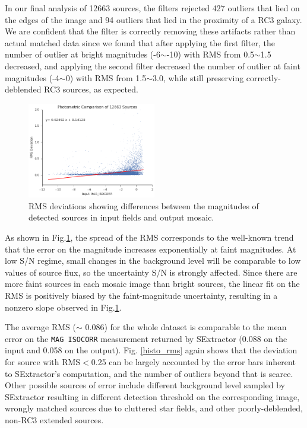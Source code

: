 \documentclass[authoryear, 12pt, 5p, times]{elsarticle}
\begin{document}
	In our final analysis of 12663 sources, the filters rejected 427 outliers that lied on the edges of the image and 94 outliers that lied in the proximity of a RC3 galaxy. We are confident that the filter is correctly removing these artifacts rather than actual matched data since we found that after applying the first filter,  the number of outlier at bright magnitudes (-6$\sim$-10) with RMS from 0.5$\sim$1.5 decreased, and applying the second filter decreased the number of outlier at faint magnitudes (-4$\sim$0) with RMS from 1.5$\sim$3.0, while still preserving correctly-deblended RC3 sources, as expected. 
\begin{figure}[h]
\includegraphics[width=0.5\textwidth]{figures/photo_preserved.png}
\caption{RMS deviations showing differences between the magnitudes of detected sources in input fields and output mosaic.}
\label{photo_preserved}
\end{figure}

	As shown in Fig.\ref{photo_preserved}, the spread of the RMS corresponds to the well-known trend that the error on the magnitude increases exponentially at faint magnitudes. At low S/N regime, small changes in the background level will be comparable to low values of source flux, so the uncertainty S/N is strongly affected. Since there are more faint sources in each mosaic image than bright sources, the linear fit on the RMS is positively biased by the faint-magnitude uncertainty, resulting in a nonzero slope observed in Fig.\ref{photo_preserved}.
	
	The average RMS ($\sim$ 0.086) for the whole dataset is comparable to the mean error on the \texttt{MAG ISOCORR} measurement returned by SExtractor (0.088 on the input and 0.058 on the output). Fig. \ref{histo_rms} again shows that the deviation for source with RMS$<$0.25 can be largely accounted by the error bars inherent to SExtractor's computation, and the number of outliers beyond that is scarce. Other possible sources of error include different background level sampled by SExtractor resulting in different detection threshold on the corresponding image, wrongly matched sources due to cluttered star fields, and other poorly-deblended, non-RC3 extended sources. 
\end{document}
